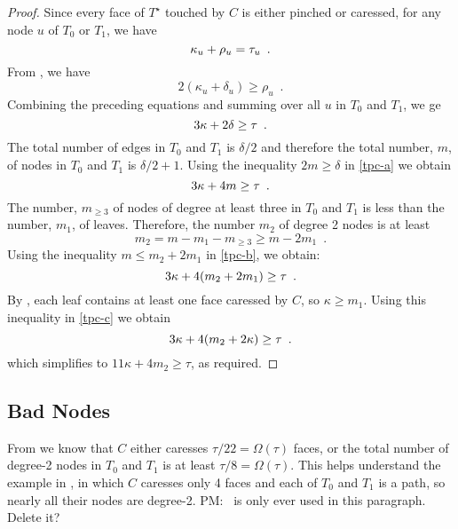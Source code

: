 \documentclass{patmorin}
\newcommand{\dual}[1]{{#1}^\star}
\newcommand{\note}[2]{{\color{red}#1:~#2}}
\begin{document}
\begin{proof}
  Since every face of $\dual{T}$ touched by $C$ is either pinched or
  caressed, for any node $u$ of $T_0$ or $T_1$, we have
  \begin{equation}
       \kappa_u + \rho_u = \tau_u \enspace . \eqlabel{tpc}
  \end{equation}
  From , we have 
  \[
      2(\kappa_u+\delta_u) \ge \rho_u \enspace .
  \]
  Combining the preceding equations and summing over all $u$ in $T_0$
  and $T_1$, we ge
  \begin{equation}
       3\kappa + 2\delta \ge \tau \enspace . \eqlabel{tpc-a}
  \end{equation}
  The total number of edges in $T_0$
  and $T_1$ is $\delta/2$ and therefore the total number, $m$,
  of nodes in $T_0$ and $T_1$ is $\delta/2+1$. Using the inequality
  $2m\ge \delta$ in \eqref{tpc-a} we obtain 
  \begin{equation}
       3\kappa + 4m \ge \tau \enspace .  \eqlabel{tpc-b}
  \end{equation}
  The number, $m_{\ge 3}$ of nodes of degree at least three in $T_0$
  and $T_1$ is less than the number, $m_1$, of leaves.  Therefore,
  the number $m_2$ of degree 2 nodes is at least
  \[
     m_2 = m - m_1 - m_{\ge 3} \ge m-2m_1 \enspace .
  \]
  Using the inequality $m\le m_2+2m_1$  in \eqref{tpc-b}, we obtain:
  \begin{equation}
       3\kappa + 4(m_2+2m_1) \ge \tau \enspace .  \eqlabel{tpc-c}
  \end{equation}
  By , each leaf contains at least one face caressed
  by $C$, so $\kappa \ge m_1$. Using this inequality in \eqref{tpc-c}
  we obtain
  \begin{equation}
       3\kappa + 4(m_2+2\kappa) \ge \tau \enspace .  \eqlabel{tpc-d}
  \end{equation}
  which simplifies to $11\kappa + 4m_2 \ge \tau$, as required.
\end{proof}

\subsection{Bad Nodes}

From  we know that $C$ either
caresses $\tau/22=\Omega(\tau)$ faces, or the total number of degree-2
nodes in $T_0$ and $T_1$ is at least $\tau/8=\Omega(\tau)$.  This helps
understand the example in , in which $C$ caresses
only 4 faces and each of $T_0$ and $T_1$ is a path, so nearly all their
nodes are degree-2. \note{PM}{ is only ever used in this paragraph. Delete it?}
\end{document}
